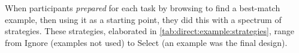 %

    
        
   When participants \emph{prepared} for each task by browsing to find a best-match example, then using it as a starting point, they did this with a spectrum of strategies. These strategies, elaborated in \autoref{tab:direct:example:strategies}, range from Ignore (examples not used) to Select (an example was the final design). 

